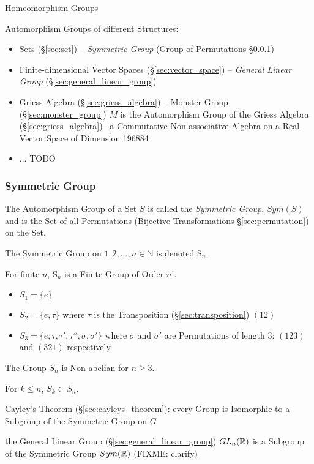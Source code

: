 Homeomorphism Groups %

Automorphism Groups of different Structures:
\begin{itemize}
  \item Sets (\S\ref{sec:set}) -- \emph{Symmetric Group} (Group of Permutations
    \S\ref{sec:symmetric_group})
  \item Finite-dimensional Vector Spaces (\S\ref{sec:vector_space}) --
    \emph{General Linear Group} (\S\ref{sec:general_linear_group})
  \item Griess Algebra (\S\ref{sec:griess_algebra}) -- Monster Group
    (\S\ref{sec:monster_group}) $M$ is the Automorphism Group of the Griess
    Algebra (\S\ref{sec:griess_algebra})-- a Commutative Non-associative Algebra
    on a Real Vector Space of Dimension 196884
  \item ... TODO
\end{itemize}



\subsubsection{Symmetric Group}\label{sec:symmetric_group}

The Automorphism Group of a Set $S$ is called the \emph{Symmetric Group},
$Sym(S)$ and is the Set of all Permutations (Bijective Transformations
\S\ref{sec:permutation}) on the Set.

The Symmetric Group on ${1, 2, ..., n} \in \mathbb{N}$ is denoted
$\mathrm{S}_n$.

For finite $n$, $\mathrm{S}_n$ is a Finite Group of Order $n!$.

\begin{itemize}
    \item $S_1 = \{e\}$
    \item $S_2 = \{e,\tau\}$ where $\tau$ is the Transposition
      (\S\ref{sec:transposition}) $(12)$
    \item $S_3 = \{e, \tau, \tau', \tau'', \sigma, \sigma'\}$ where $\sigma$ and
      $\sigma'$ are Permutations of length 3: $(123)$ and $(321)$ respectively
\end{itemize}
The Group $S_n$ is Non-abelian for $n \geq 3$.

For $k \leq n$, $S_k \subset S_n$.

Cayley's Theorem (\S\ref{sec:cayleys_theorem}): every Group is Isomorphic to a
Subgroup of the Symmetric Group on $G$

\fist the General Linear Group (\S\ref{sec:general_linear_group}) $GL_n(\mathbb{R})$
is a Subgroup of the Symmetric Group $Sym(\mathbb{R})$ (FIXME: clarify)

